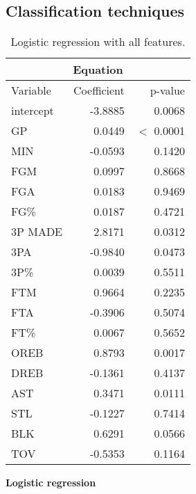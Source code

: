 \subsection*{Classification techniques}\label{appendix:ct}

\begin{table}[H]
	\centering
	\begin{tabular}{|| l | r | r ||} 
		\hline
		\multicolumn{3}{|c|}{Equation} \\
		\hline
		Variable & Coefficient & p-value \\
		\hline
		intercept & -3.8885 & 0.0068 \\
		GP & 0.0449 & $<$ 0.0001 \\
		MIN & -0.0593 & 0.1420 \\
		FGM & 0.0997 & 0.8668 \\
		FGA & 0.0183 & 0.9469 \\
		FG\% & 0.0187 & 0.4721 \\
		3P MADE & 2.8171 & 0.0312 \\
		3PA & -0.9840 & 0.0473 \\
		3P\% & 0.0039 & 0.5511 \\
		FTM & 0.9664 & 0.2235 \\
		FTA & -0.3906 & 0.5074 \\
		FT\% & 0.0067 & 0.5652 \\
		OREB & 0.8793 & 0.0017 \\
		DREB & -0.1361 & 0.4137 \\
		AST & 0.3471 & 0.0111 \\
		STL & -0.1227 & 0.7414 \\
		BLK & 0.6291 & 0.0566 \\				
		TOV & -0.5353 & 0.1164 \\		
		\hline
	\end{tabular}
	\caption{Logistic regression with all features.}
	\label{table:LRAllSum}
\end{table}

\noindent
\textbf{Logistic regression}

\begin{center}



\end{center}

